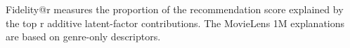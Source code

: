 \begin{table}[htbp]
\centering
\caption{Explanation metrics for the tuned coupled NMF on MovieLens 1M test recommendations.}
\label{tab:ml1m_coupled_test_explanation_metrics_seed42}
\vspace{0.35em}
\begin{minipage}{0.96\textwidth}
\footnotesize Fidelity@r measures the proportion of the recommendation score explained by the top r additive latent-factor contributions. The MovieLens 1M explanations are based on genre-only descriptors.
\end{minipage}
\end{table}
